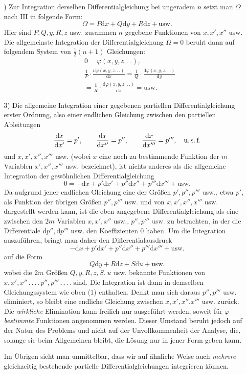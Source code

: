 ) Zur Integration derselben Differentialgleichung bei ungeradem $n$ setzt man $\Omega$ nach III in folgende Form:
\[
\Omega=P\mathrm{d}x+Q\mathrm{d}y+R\mathrm{d}z+\mathrm{usw.}
\]
Hier sind $P,Q,y,R,z$ usw. zusammen $n$ gegebene Funktionen von $x,x',x''$ usw. Die allgemeinste Integration der Differentialgleichung $\Omega=0$ beruht dann auf folgendem System von $\frac12(n+1)$ Gleichungen:
\[
\begin{aligned}&0=\varphi(x,y,z.\,.\,.),\\&
\frac1P\cdot\frac{\mathrm{d}\varphi(x,y,z.\,.\,.)}{\mathrm{d}x}
=\frac1Q\cdot\frac{\mathrm{d}\varphi(x,y,z.\,.\,.)}{\mathrm{d}y}
\\&=\frac1R\cdot\frac{\mathrm{d}\varphi(x,y,z.\,.\,.)}{\mathrm{d}z}=\mathrm{usw.}\end{aligned}
\]
\par{}
3) Die allgemeine Integration einer gegebenen partiellen Differentialgleichung erster Ordnung, also einer endlichen Gleichung zwischen den partiellen Ableitungen
\[
\frac{\mathrm{d}x}{\mathrm{d}x'}=p',\qquad
\frac{\mathrm{d}x}{\mathrm{d}x''}=p'',\qquad
\frac{\mathrm{d}x}{\mathrm{d}x'''}=p''',\quad\text{u.\,s.\,f.}
\]
und $x,x',x'',x'''$ usw. (wobei $x$ eine noch zu bestimmende Funktion der $m$ Variablen $x',x'',x'''$ usw. bezeichnet), ist nichts anderes als die allgemeine Integration der gewöhnlichen Differentialgleichung
\[
0=-\mathrm{d}x+p'\mathrm{d}x'+p''\mathrm{d}x''+p'''\mathrm{d}x'''+\text{usw.}
\]
Da aufgrund jener endlichen Gleichung eine der Größen $p',p'',p'''$ usw., etwa $p'$, als Funktion der übrigen Größen $p'',p'''$ usw. und von $x,x',x'',x'''$ usw. dargestellt werden kann, ist die eben angegebene Differentialgleichung als eine zwischen den $2m$ Variablen $x,x',x''$ usw., $p'',p'''$ usw. zu betrachten, in der die Differentiale $\mathrm{d}p'',\mathrm{d}p'''$ usw. den Koeffizienten $0$ haben. Um die Integration auszuführen, bringt man daher den Differentialausdruck
\[
-\mathrm{d}x+p'\mathrm{d}x'+p''\mathrm{d}x''+p'''\mathrm{d}x'''+\text{usw.}
\]
auf die Form
\[
Q\mathrm{d}y+R\mathrm{d}z+S\mathrm{d}u+\text{usw.}
\]
wobei die $2m$ Größen $Q,y,R,z,S.\ u$ usw. bekannte Funktionen von $x,x',x''\, .\, .\, .\, .\, p'',p'''\, .\, .\, .\, .$ sind. Die Integration ist dann in demselben Gleichungssystem wie oben (1) enthalten. Denkt man sich daraus $p'',p'''$ usw. eliminiert, so bleibt eine endliche Gleichung zwischen $x,x',x''.x'''$ usw. zurück. Die \emph{wirkliche} Elimination kann freilich nur ausgeführt werden, soweit für $\varphi$ \emph{bestimmte} Funktionen angenommen werden. Dieser Umstand beruht jedoch auf der Natur des Problems und nicht auf der Unvollkommenheit der Analyse, die, solange sie beim Allgemeinen bleibt, die Lösung nur in jener Form geben kann.

Im Übrigen sieht man unmittelbar, dass wir auf ähnliche Weise auch \emph{mehrere} gleichzeitig bestehende partielle Differentialgleichungen integrieren können.


